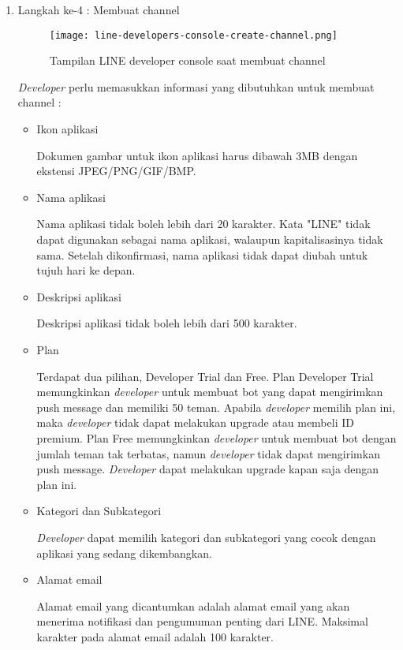 \begin{enumerate}
\item Langkah ke-4 : Membuat channel
\begin{figure}[H]
	\centering  
	\texttt{[image: line-developers-console-create-channel.png]}  
	\caption[Tampilan LINE developer console saat membuat channel]{Tampilan LINE developer console saat membuat channel} 
	\label{fig:line-developers-console-create-channel} 
\end{figure}

\textit{Developer} perlu memasukkan informasi yang dibutuhkan untuk membuat channel :
\begin{itemize}
\item Ikon aplikasi

Dokumen gambar untuk ikon aplikasi harus dibawah 3MB dengan ekstensi JPEG/PNG/GIF/BMP.

\item Nama aplikasi

Nama aplikasi tidak boleh lebih dari 20 karakter. Kata "LINE" tidak dapat digunakan sebagai nama aplikasi, walaupun kapitalisasinya tidak sama. Setelah dikonfirmasi, nama aplikasi tidak dapat diubah untuk tujuh hari ke depan.

\item Deskripsi aplikasi

Deskripsi aplikasi tidak boleh lebih dari 500 karakter.

\item Plan

Terdapat dua pilihan, Developer Trial dan Free. Plan Developer Trial memungkinkan \textit{developer} untuk membuat bot yang dapat mengirimkan push message dan memiliki 50 teman. Apabila \textit{developer} memilih plan ini, maka \textit{developer} tidak dapat melakukan upgrade atau membeli ID premium. Plan Free memungkinkan \textit{developer} untuk membuat bot dengan jumlah teman tak terbatas, namun \textit{developer} tidak dapat mengirimkan push message. \textit{Developer} dapat melakukan upgrade kapan saja dengan plan ini.

\item Kategori dan Subkategori

\textit{Developer} dapat memilih kategori dan subkategori yang cocok dengan aplikasi yang sedang dikembangkan.

\item Alamat email

Alamat email yang dicantumkan adalah alamat email yang akan menerima notifikasi dan pengumuman penting dari LINE. Maksimal karakter pada alamat email adalah 100 karakter.


\end{itemize}
\end{enumerate}
